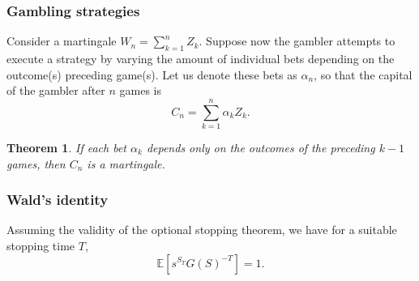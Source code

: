 \documentclass{article}
\newtheorem{theorem}{Theorem}
\newcommand{\E}{\mathbb{E}}
\begin{document}
\subsubsection{Gambling strategies}
Consider a martingale $W_n = \sum_{k=1}^n Z_k$. Suppose now the gambler attempts to execute a strategy by varying the amount of individual bets depending on the outcome(s) preceding game(s). Let us denote these bets as $\alpha_n$, so that the capital of the gambler after $n$ games is
\begin{equation}
    C_n = \sum_{k=1}^n \alpha_k Z_k.
\end{equation}
\begin{theorem}
    If each bet $\alpha_k$ depends only on the outcomes of the preceding $k-1$ games, then $C_n$ is a martingale.
\end{theorem}

\subsubsection{Wald's identity}
Assuming the validity of the optional stopping theorem, we have for a suitable stopping time $T$,
\begin{equation}
    \E[s^{S_T}G(S)^{-T}] = 1.
\end{equation}
\end{document}

